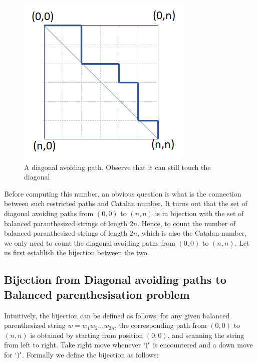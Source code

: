 \begin{figure}[h!]
    \centering
    \includegraphics[width=0.4\linewidth]{images/diagonal-avoiding-path.png}
    \caption{A diagonal avoiding path. Observe that it can still touch the diagonal}
    \label{fig:diagonal-avoiding-path}
\end{figure}

Before computing this number, an obvious question is what is the connection between such restricted paths and Catalan number. It turns out that the set of diagonal avoiding paths from $(0,0)$ to $(n,n)$ is in bijection with the set of balanced paranthesized strings of length $2n$. Hence, to count the number of balanced paranthesized strings of length $2n$, which is also the Catalan number, we only need to count the diagonal avoiding paths from $(0,0)$ to $(n,n)$. Let us first establish the bijection between the two.

\subsection{Bijection from Diagonal avoiding paths to Balanced parenthesisation problem}
Intuitively, the bijection can be defined as follows: for any given balanced parenthesized string $w = w_1w_2\ldots w_{2n}$, the corresponding path from $(0,0)$ to $(n,n)$ is obtained by starting from position $(0,0)$, and scanning the string from left to right. Take  right move whenever $`('$ is encountered and a down move for $`)'$. Formally we define the bijection as follows:
\medskip{}

